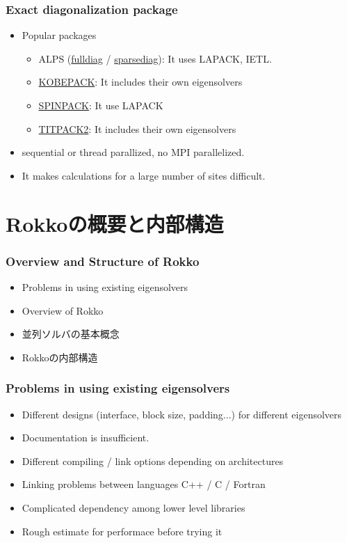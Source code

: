 \begin{frame}
  \frametitle{Exact diagonalization package}
  \begin{itemize}
    \setlength{\itemsep}{1em}
  \item Popular packages
    \begin{itemize}
    \item ALPS (\href{http://alps.comp-phys.org/static/software/applications/diag/fulldiag/doc/}{fulldiag} / \href{http://alps.comp-phys.org/mediawiki/index.php/Documentation:sparsediag}{sparsediag}): It uses LAPACK, IETL.
    \item \href{http://quattro.phys.sci.kobe-u.ac.jp/Kobe_Pack/Kobe_Pack.html}{KOBEPACK}: It includes their own eigensolvers
    \item \href{http://www-e.uni-magdeburg.de/jschulen/spin/}{SPINPACK}: It use LAPACK
    \item \href{http://www.noc.titech.ac.jp/~phys0016_nishimori/titpack2_new/index-e.html}{TITPACK2}: It includes their own eigensolvers
    \end{itemize}
  \item sequential or thread parallized, no MPI parallelized.
  \item It makes calculations for a large number of sites difficult.
  \end{itemize}
\end{frame}

\section{Rokkoの概要と内部構造}

\begin{frame}
  \frametitle{Overview and Structure of Rokko}
  \begin{itemize}
    \setlength{\itemsep}{1em}
  \item Problems in using existing eigensolvers
  \item Overview of Rokko
  \item 並列ソルバの基本概念
  \item Rokkoの内部構造
  \end{itemize}
\end{frame}

\begin{frame}
  \frametitle{Problems in using existing eigensolvers}
  \begin{itemize}
    \setlength{\itemsep}{1em}
  \item Different designs (interface, block size, padding...) for different eigensolvers
  \item Documentation is insufficient.
  \item Different compiling / link options depending on architectures
  \item Linking problems between languages C++ / C / Fortran
  \item Complicated dependency among lower level libraries
  \item Rough estimate for performace before trying it
  \end{itemize}
\end{frame}

